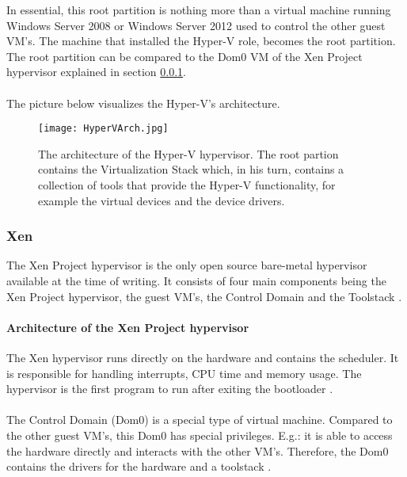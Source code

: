 In essential, this root partition is nothing more than a virtual machine running Windows Server 2008 or Windows Server 2012 used to control the other guest VM's. The machine that installed the Hyper-V role, becomes the root partition.
The root partition can be compared to the Dom0 VM of the Xen Project hypervisor explained in section \ref{subsub:Xen}. \\ \\
The picture below visualizes the Hyper-V's architecture.
\begin{figure}[h]
    \centering
    \texttt{[image: HyperVArch.jpg]}
    \caption[Hyper-V Architecture]{The architecture of the Hyper-V hypervisor. The root partion contains the Virtualization Stack which, in his turn, contains a collection of tools that provide the Hyper-V functionality, for example the virtual devices and the device drivers.}
\end{figure}


\clearpage

\subsubsection{Xen}
\label{subsub:Xen}
The Xen Project hypervisor is the only open source bare-metal hypervisor available at the time of writing. It consists of four main components being the Xen Project hypervisor, the guest VM's, the Control Domain and the Toolstack \citep{Xen1}. \\
\paragraph{Architecture of the Xen Project hypervisor}
The Xen hypervisor runs directly on the hardware and contains the scheduler. It is responsible for handling interrupts, CPU time and memory usage. The hypervisor is the first program to run after exiting the bootloader \citep{Xen1}.\\ \\
The Control Domain (Dom0) is a special type of virtual machine. Compared to the other guest VM's, this Dom0 has special privileges. E.g.: it is able to access the hardware directly and interacts with the other VM's. Therefore, the Dom0 contains the drivers for the hardware and a toolstack \citep{Xen1}.

